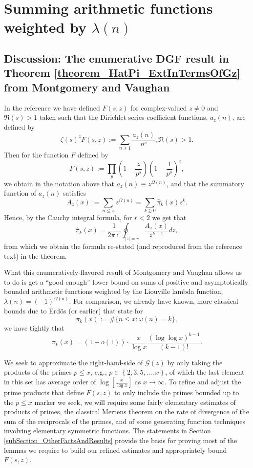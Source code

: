 \documentclass[11pt,reqno,a4letter]{article}
\numberwithin{figure}{section}
\numberwithin{table}{section}
\theoremstyle{plain}
\numberwithin{theorem}{section}
\theoremstyle{definition}
\begin{document}
\newpage 
\section{Summing arithmetic functions weighted by $\lambda(n)$} 
\label{Section_MVCh7_GzBounds} 
        
\subsection{Discussion: The enumerative DGF result in Theorem \ref{theorem_HatPi_ExtInTermsOfGz} from 
            Montgomery and Vaughan} 

In the reference we have defined $F(s, z)$ for complex-valued $z \neq 0$ and $\Re(s) > 1$ 
taken such that the 
Dirichlet series coefficient functions, $a_z(n)$, are defined by 
\[
\zeta(s)^z F(s, z) := \sum_{n \geq 1} \frac{a_z(n)}{n^s}, \Re(s) > 1. 
\]
Then for the function $F$ defined by 
\[
F(s, z) := \prod_p \left(1 - \frac{z}{p^s}\right) \left(1-\frac{1}{p^s}\right)^z, 
\]
we obtain in the notation above that $a_z(n) \equiv z^{\Omega(n)}$, and that the summatory 
function of $a_z(n)$ satisfies 
\[
A_z(x) := \sum_{n \leq x} z^{\Omega(n)} = \sum_{k \geq 0} \widehat{\pi}_k(x) z^k. 
\]
Hence, by the Cauchy integral formula, for $r < 2$ we get that 
\[
\widehat{\pi}_k(x) = \frac{1}{2\pi\imath} \oint_{|z|=r} \frac{A_z(x)}{z^{k+1}} dz, 
\]
from which we obtain the formula re-stated (and reproduced from the reference text) in the theorem. 

What this enumeratively-flavored result of Montgomery and Vaughan allows us to do is get a 
``good enough'' lower bound on sums of positive and asymptotically bounded arithmetic functions 
weighted by the Liouville lambda function, $\lambda(n) = (-1)^{\Omega(n)}$. 
For comparison, we already have known, more classical bounds due to Erd\"os (or earlier) that state for 
\[
\pi_k(x) := \#\{n \leq x: \omega(n) = k\}, 
\]
we have tightly that \cite{ERDOS-PRIMEK-FUNC,MV} 
\[
\pi_k(x) = (1 + o(1)) \cdot \frac{x}{\log x} \frac{(\log\log x)^{k-1}}{(k-1)!}. 
\] 

We seek to approximate the right-hand-side of $\mathcal{G}(z)$ by only taking the products of the primes 
$p \leq x$, e.g., $p \in \left\{2,3,5,\ldots,x\right\}$, of which the last element in this set 
has average order of $\log\left[\frac{x}{\log x}\right]$ as $x \rightarrow \infty$. 
To refine and adjust the prime products that define $F(s, z)$ to only include the primes bounded up to the $p \leq x$ 
marker we seek, we will require some fairly elementary estimates of products of primes, 
the classical Mertens theorem on the 
rate of divergence of the sum of the reciprocals of the primes, and of some generating function 
techniques involving elementary symmetric functions. 
The statements in Section \ref{subSection_OtherFactsAndResults} provide the basis for proving 
most of the lemmas we require to build our refined estimates and appropriately bound $F(s, z)$. 
\end{document}
